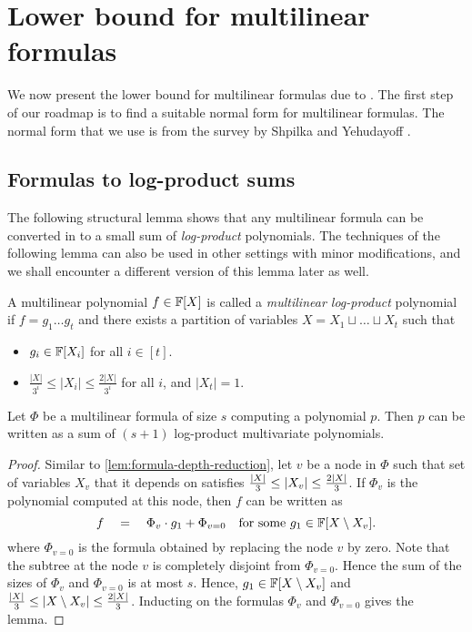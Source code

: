 \section{Lower bound for multilinear formulas}
	We now present the lower bound for multilinear formulas due 
	to \cite{raz2004}. 
The first step of our roadmap is to find 
	a suitable normal form for multilinear formulas. 
The normal 
	form that we use is from the survey by Shpilka and 
	Yehudayoff \cite{sy}. 	

\subsection{Formulas to log-product sums}

The following structural lemma shows that any multilinear formula can be converted in to a small sum of \emph{log-product} polynomials. 
The techniques of the following lemma can also be used in other settings with minor modifications, and we shall encounter a different version of this lemma later as well.

\begin{definition}\label{defn:mult-logproduct}
  A multilinear polynomial $f\in \mathbb{F}[X]$ is called a \emph{multilinear log-product} polynomial if $f = g_1\dots g_t$ and there exists a partition of variables $X = X_1 \sqcup \dots \sqcup X_t$ such that
  \begin{itemize}
  \item $g_i \in \mathbb{F}[X_i]$ for all $i \in [t]$.
  \item $\frac{|X|}{3^i} \leq |X_i| \leq \frac{2|X|}{3^i}$ for all
    $i$, and $|X_t| = 1$.
  \end{itemize}
\end{definition}

\begin{lemma}\label{lem:mult-logproduct}
  Let $\Phi$ be a multilinear formula of size $s$ computing a polynomial $p$. 
Then $p$ can be written as a sum of $(s+1)$ log-product multivariate polynomials.
\end{lemma}
\begin{proof}
  Similar to \autoref{lem:formula-depth-reduction}, let $v$ be a node in $\Phi$ such that set of variables $X_v$ that it depends on satisfies $\frac{|X|}{3} \leq \left|X_v\right| \leq \frac{2|X|}{3}$. 
If $\Phi_v$ is the polynomial computed at this node, then $f$ can be written as
  $$
  f \quad = \quad \Phi_v \cdot g_1 + \Phi_{v=0} \quad\text{for some $g_1 \in \mathbb{F}[X\setminus X_v]$}.
  $$
  where $\Phi_{v=0}$ is the formula obtained by replacing the node $v$ by zero. 
Note that the subtree at the node $v$ is completely disjoint from $\Phi_{v=0}$. 
Hence the sum of the sizes of $\Phi_v$ and $\Phi_{v=0}$ is at most $s$. 
Hence, $g_1 \in \mathbb{F}[X\setminus X_v]$ and $\frac{|X|}{3} \leq \left|X \setminus X_v\right| \leq \frac{2|X|}{3}$. 
Inducting on the formulas $\Phi_v$ and $\Phi_{v=0}$ gives the lemma.
\end{proof}

